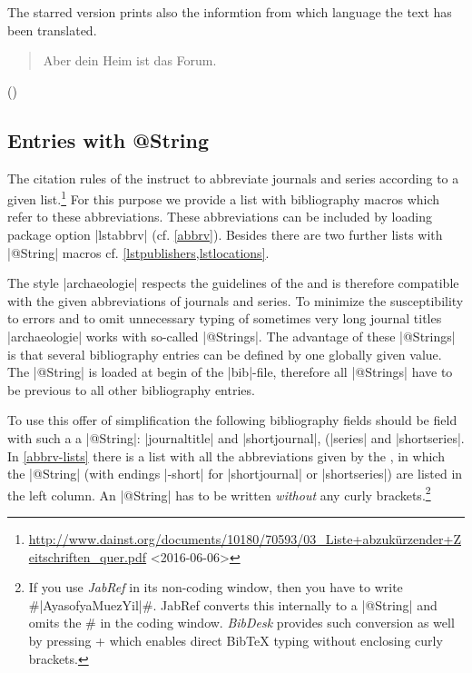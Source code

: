 \documentclass[a4paper,
10pt,
greek,
french,
spanish,
italian,
ngerman,
english
]{ltxdoc}
\begin{document}
The starred version prints also the informtion from which language the text has been translated.

\begin{example}
\blockcquote[12,25,1]{Cic:Att}{Aber dein Heim ist das Forum.} ()
\end{example}



\subsection{Entries with @String}\label{string}
The citation rules of the \DAI instruct to abbreviate journals and series according to a given list.\footnote{\url{http://www.dainst.org/documents/10180/70593/03_Liste+abzukürzender+Zeitschriften_quer.pdf} <2016-06-06>}
For this purpose we provide a list with bibliography macros which refer to these abbreviations. 
These abbreviations can be included by loading package option |lstabbrv| (cf. \cref{abbrv}). 
Besides there are two further lists with |@String| macros cf. \cref{lstpublishers,lstlocations}.

 The style |archaeologie| respects the guidelines of the \DAI 
and is therefore compatible with the given abbreviations of journals and series.
To minimize the susceptibility to errors and to omit unnecessary typing of sometimes very long journal titles |archaeologie| works with so-called |@Strings|.
The advantage of these |@Strings| is that several bibliography entries can be defined by one globally given value. 
The |@String| is loaded at begin of the |bib|-file, therefore all |@Strings| have to be previous to all other bibliography entries.
 
To use this offer of simplification the following bibliography fields should be field with such a a |@String|: |journaltitle| and |shortjournal|,
(|series| and |shortseries|.
In \cref{abbrv-lists} there is a list with all the abbreviations given by the \DAI, 
in which the |@String| (with endings |-short| for |shortjournal| or |shortseries|) are listed in the left column.  
An |@String| has to be written \emph{without} any curly brackets.\footnote{If you use \emph{JabRef} in its non-coding window, 
then you have to write \#|AyasofyaMuezYil|\#. 
JabRef converts this internally to a |@String| and omits the \# in the coding window. 
\emph{BibDesk} provides such conversion as well by pressing
\LKeyStrg + 
 which enables direct BibTeX typing without enclosing curly brackets.}
\end{document}
